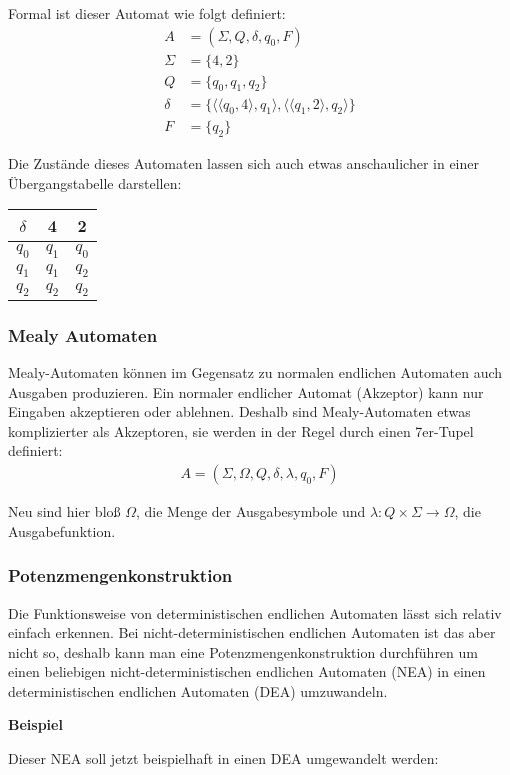 \begin{flushleft}
Formal ist dieser Automat wie folgt definiert:
\begin{align}
    A &= (\Sigma,Q,\delta,q_0,F) \\
    \Sigma &= \{4,2\} \\
    Q &= \{q_0,q_1,q_2\} \\
    \delta &= \{\langle \langle q_0, 4 \rangle, q_1 \rangle, \langle \langle q_1, 2 \rangle, q_2 \rangle \} \\
    F &= \{q_2\}
\end{align}

Die Zustände dieses Automaten lassen sich auch etwas anschaulicher in einer Übergangstabelle darstellen:
\end{flushleft}

\begin{center}
\begin{tabular}{|c|c|c|}
    \hline
    $\delta$ & 4 & 2 \\
    \hline
    $q_0$ & $q_1$ & $q_0$ \\
    \hline
    $q_1$ & $q_1$ & $q_2$ \\
    \hline
    $q_2$ & $q_2$ & $q_2$ \\
    \hline
\end{tabular}
\end{center}

\subsubsection{Mealy Automaten}
\begin{flushleft}
Mealy-Automaten können im Gegensatz zu normalen endlichen Automaten
auch Ausgaben produzieren. Ein normaler endlicher Automat (Akzeptor)
kann nur Eingaben akzeptieren oder ablehnen. Deshalb sind
Mealy-Automaten etwas komplizierter als Akzeptoren,
sie werden in der Regel durch einen 7er-Tupel definiert:
\begin{align}
    A=(\Sigma,\Omega,Q,\delta,\lambda,q_0,F)
\end{align}

Neu sind hier bloß $\Omega$,
die Menge der Ausgabesymbole und
$\lambda: Q \times \Sigma \rightarrow \Omega$, die Ausgabefunktion.
\end{flushleft}

\subsubsection{Potenzmengenkonstruktion}
\begin{flushleft}
Die Funktionsweise von deterministischen endlichen Automaten
lässt sich relativ einfach erkennen. Bei nicht-deterministischen
endlichen Automaten ist das aber nicht so, deshalb kann man eine
Potenzmengenkonstruktion durchführen um einen beliebigen
nicht-deterministischen endlichen Automaten (NEA) in einen
deterministischen endlichen Automaten (DEA) umzuwandeln.

\textbf{Beispiel \cite{potenzmengenkonstruktion}}

Dieser NEA soll jetzt beispielhaft in einen DEA umgewandelt werden:
\end{flushleft}
    

